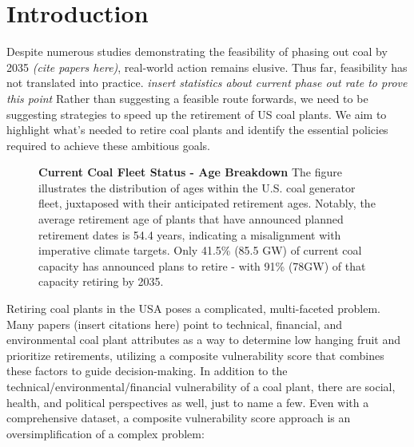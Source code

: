\section{Introduction}

Despite numerous studies demonstrating the feasibility of phasing out coal by 2035 \textit{(cite papers here)}, real-world action remains elusive. Thus far, feasibility has not translated into practice. \textit{insert statistics about current phase out rate to prove this point} Rather than suggesting a feasible route forwards, we need to be suggesting strategies to speed up the retirement of US coal plants. We aim to highlight what's needed to retire coal plants and identify the essential policies required to achieve these ambitious goals.


\begin{figure}[h]
    
    
    \label{fig:1}
    \caption{\textbf{Current Coal Fleet Status - Age Breakdown} The figure illustrates the distribution of ages within the U.S. coal generator fleet, juxtaposed with their anticipated retirement ages. Notably, the average retirement age of plants that have announced planned retirement dates is 54.4 years, indicating a misalignment with imperative climate targets. Only 41.5\% (85.5 GW) of current coal capacity has announced plans to retire - with 91\% (78GW) of that capacity retiring by 2035.}
\end{figure}


Retiring coal plants in the USA poses a complicated, multi-faceted problem. Many papers (insert citations here) point to technical, financial, and environmental coal plant attributes as a way to determine low hanging fruit and prioritize retirements, utilizing a composite vulnerability score that combines these factors to guide decision-making. In addition to the technical/environmental/financial vulnerability of a coal plant, there are social, health, and political perspectives as well, just to name a few. Even with a comprehensive dataset, a composite vulnerability score approach is an oversimplification of a complex problem:

